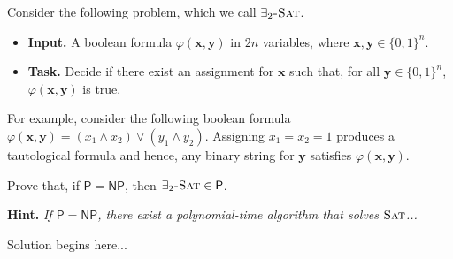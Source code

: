 \documentclass{article}
\begin{document}
\begin{question}
Consider the following problem, which we call $\exists_2\mathsf{\textsc{\text{-}Sat}}$.

\begin{itemize}
    \item[] {\bfseries Input.} A boolean formula $\varphi(\mathbf x, \mathbf y)$ in $2n$ variables, where $\mathbf x, \mathbf y \in \{0, 1\}^n$.

    \item[] {\bfseries Task.} Decide if there exist an assignment for $\mathbf x$ such that, for all $\mathbf y \in \{0, 1\}^n$, $\varphi(\mathbf x, \mathbf y)$ is true.
\end{itemize}

For example, consider the following boolean formula $\varphi(\mathbf x, \mathbf y) = (x_1 \land x_2) \lor (y_1 \land y_2)$. Assigning $x_1 = x_2 = 1$ produces a tautological formula and hence, any binary string for $\mathbf y$ satisfies $\varphi(\mathbf x, \mathbf y)$.

Prove that, if $\mathsf P = \mathsf{NP}$, then $\exists_2\mathsf{\textsc{\text{-}Sat}} \in \mathsf P$.

{\bfseries Hint.} {\em If $\mathsf P = \mathsf{NP}$, there exist a polynomial-time algorithm that solves $\mathsf{\textsc{Sat}}$...}
\end{question}

\begin{solution}
Solution begins here...
\end{solution}
\end{document}
